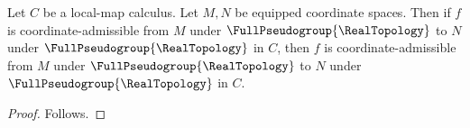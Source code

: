 


\begin{theorem}\label{coordinate_map_closed_pseudogroup_probe}
    Let $C$ be a local-map calculus.
    Let $M,N$ be equipped coordinate spaces.
    Then if $f$ is coordinate-admissible from $M$ under $\FullPseudogroup{\RealTopology}$
        to $N$ under $\FullPseudogroup{\RealTopology}$ in $C$,
        then $f$ is coordinate-admissible from $M$ under $\FullPseudogroup{\RealTopology}$
        to $N$ under $\FullPseudogroup{\RealTopology}$ in $C$.
\end{theorem}
\begin{proof}
    Follows.
\end{proof}
